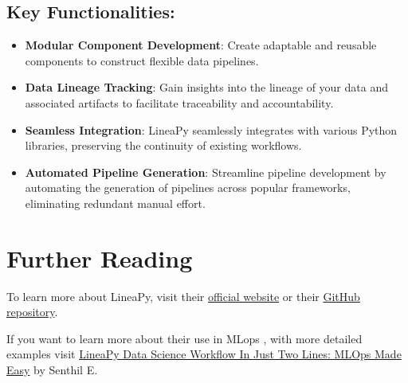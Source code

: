 	\subsection{Key Functionalities:}
	\begin{itemize}
		\item \textbf{Modular Component Development}: Create adaptable and reusable components to construct flexible data pipelines.
		\item \textbf{Data Lineage Tracking}: Gain insights into the lineage of your data and associated artifacts to facilitate traceability and accountability.
		\item \textbf{Seamless Integration}: LineaPy seamlessly integrates with various Python libraries, preserving the continuity of existing workflows.
		\item \textbf{Automated Pipeline Generation}: Streamline pipeline development by automating the generation of pipelines across popular frameworks, eliminating redundant manual effort.
	\end{itemize}

	\section{Further Reading}
	
	To learn more about LineaPy, visit their \href{https://lineapy.org/}{official website} or their \href{https://github.com/LineaLabs/lineapy}{GitHub repository}.
	
	If you want to learn more about their use in MLops , with more detailed examples visit \href{https://towardsdatascience.com/lineapy-data-science-workflow-in-just-two-lines-mlops-made-easy-679f36ac63bd}{LineaPy Data Science Workflow In Just Two Lines: MLOps Made Easy} by Senthil E. 

